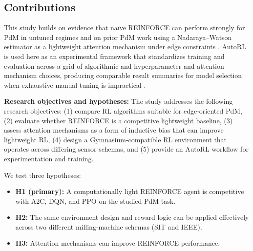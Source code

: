 \documentclass[sn-basic]{sn-jnl} %
\begin{document}
\subsection{Contributions}

This study builds on evidence that na\"{i}ve \textsc{REINFORCE} can perform strongly for PdM in untuned regimes \cite{Siraskar2025} and on prior PdM work using a Nadaraya--Watson estimator as a lightweight attention mechanism under edge constraints \cite{Siraskar2024}. AutoRL is used here as an experimental framework that standardizes training and evaluation across a grid of algorithmic and hyperparameter and attention mechanism choices, producing comparable result summaries for model selection when exhaustive manual tuning is impractical \cite{Schwartz2020, Strubell2019, Faust2019, Mussi2022}.

\textbf{Research objectives and hypotheses:}
The study addresses the following research objectives: (1) compare RL algorithms suitable for edge-oriented PdM, (2) evaluate whether \textsc{REINFORCE} is a competitive lightweight baseline, (3) assess attention mechanisms as a form of inductive bias that can improve lightweight RL, (4) design a Gymnasium-compatible RL environment that operates across differing sensor schemas, and (5) provide an AutoRL workflow for experimentation and training.

We test three hypotheses:
\begin{itemize}
	\item \textbf{H1 (primary):} A computationally light \textsc{REINFORCE} agent is competitive with \textsc{A2C}, \textsc{DQN}, and \textsc{PPO} on the studied PdM task.
	\item \textbf{H2:} The same environment design and reward logic can be applied effectively across two different milling-machine schemas (SIT and IEEE).
	\item \textbf{H3:} Attention mechanisms can improve \textsc{REINFORCE} performance.
\end{itemize}
\end{document}
